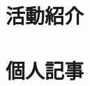 \documentclass[a5paper,openary]{jsbook}%
\begin{document}
\part{活動紹介}\label{Part:Katsudo}



\afterpage{\blankpage}

\part{個人記事}\label{Part:KOJIN}



\backmatter


\end{document}
